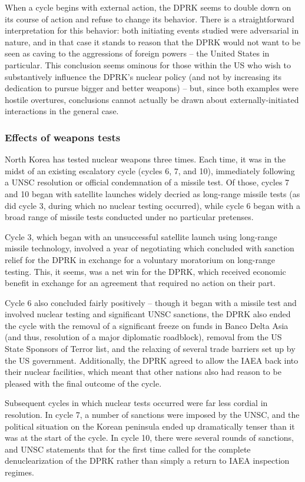 \documentclass{article}
\begin{document}
When a cycle begins with external action, the DPRK seems to double down on its course of action and refuse to change its behavior. There is a straightforward interpretation for this behavior: both initiating events studied were adversarial in nature, and in that case it stands to reason that the DPRK would not want to be seen as caving to the aggressions of foreign powers – the United States in particular. This conclusion seems ominous for those within the US who wish to substantively influence the DPRK’s nuclear policy (and not by increasing its dedication to pursue bigger and better weapons) – but, since both examples were hostile overtures, conclusions cannot actually be drawn about externally-initiated interactions in the general case.

\subsubsection{Effects of weapons tests}
North Korea has tested nuclear weapons three times. Each time, it was in the midst of an existing escalatory cycle (cycles 6, 7, and 10), immediately following a UNSC resolution or official condemnation of a missile test. Of those, cycles 7 and 10 began with satellite launches widely decried as long-range missile tests (as did cycle 3, during which no nuclear testing occurred), while cycle 6 began with a broad range of missile tests conducted under no particular pretenses.

Cycle 3, which began with an unsuccessful satellite launch using long-range missile technology, involved a year of negotiating which concluded with sanction relief for the DPRK in exchange for a voluntary moratorium on long-range testing. This, it seems, was a net win for the DPRK, which received economic benefit in exchange for an agreement that required no action on their part.

Cycle 6 also concluded fairly positively – though it began with a missile test and involved nuclear testing and significant UNSC sanctions, the DPRK also ended the cycle with the removal of a significant freeze on funds in Banco Delta Asia (and thus, resolution of a major diplomatic roadblock), removal from the US State Sponsors of Terror list, and the relaxing of several trade barriers set up by the US government. Additionally, the DPRK agreed to allow the IAEA back into their nuclear facilities, which meant that other nations also had reason to be pleased with the final outcome of the cycle.

Subsequent cycles in which nuclear tests occurred were far less cordial in resolution. In cycle 7, a number of sanctions were imposed by the UNSC, and the political situation on the Korean peninsula ended up dramatically tenser than it was at the start of the cycle. In cycle 10, there were several rounds of sanctions, and UNSC statements that for the first time called for the complete denuclearization of the DPRK rather than simply a return to IAEA inspection regimes.
\end{document}
